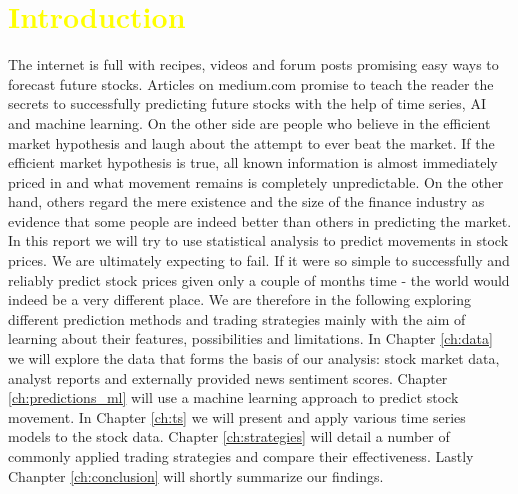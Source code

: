 \chapter{\textcolor{yellow}{Introduction}} \label{ch:Introduction}

The internet is full with recipes, videos and forum posts promising easy ways to forecast future stocks. Articles on medium.com promise to teach the reader the secrets to successfully predicting future stocks with the help of time series, AI and machine learning. On the other side are people who believe in the efficient market hypothesis and laugh about the attempt to ever beat the market. If the efficient market hypothesis is true, all known information is almost immediately priced in and what movement remains is completely unpredictable. On the other hand, others regard the mere existence and the size of the finance industry as evidence that some people are indeed better than others in predicting the market. In this report we will try to use statistical analysis to predict movements in stock prices. We are ultimately expecting to fail. If it were so simple to successfully and reliably predict stock prices given only a couple of months time - the world would indeed be a very different place. We are therefore in the following exploring different prediction methods and trading strategies mainly with the aim of learning about their features, possibilities and limitations. In Chapter \ref{ch:data} we will explore the data that forms the basis of our analysis: stock market data, analyst reports and externally provided news sentiment scores. Chapter \ref{ch:predictions_ml} will use a machine learning approach to predict stock movement. In Chapter \ref{ch:ts} we will present and apply various time series models to the stock data. Chapter \ref{ch:strategies} will detail a number of commonly applied trading strategies and compare their effectiveness. Lastly Chanpter \ref{ch:conclusion} will shortly summarize our findings. 







